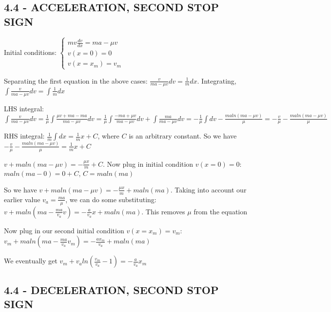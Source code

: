 \documentclass{article}
\begin{document}
\subsection{4.4 - ACCELERATION, SECOND STOP SIGN}
\noindent Initial conditions:
$\begin{cases}
    mv\frac{dv}{dx} = ma - \mu v \\
    v(x = 0) = 0 \\
    v(x = x_{m}) = v_{m}
    \end{cases}$ \par\vspace{0.25cm}

\noindent Separating the first equation in the above cases: $\frac{v}{ma - \mu v} dv = \frac{1}{m}dx$.  Integrating, $\int\frac{v}{ma - \mu v} dv = \int\frac{1}{m}dx$ \par
\noindent LHS integral: $\int\frac{v}{ma - \mu v} dv = \frac{1}{\mu}\int\frac{\mu v + ma - ma}{ma - \mu v}dv = \frac{1}{\mu}\int\frac{-ma + \mu v}{ma - \mu v}dv + \int\frac{ma}{ma - \mu v}dv = -\frac{1}{\mu}\int dv - \frac{maln(ma - \mu v)}{\mu} = -\frac{v}{\mu} - \frac{maln(ma - \mu v)}{\mu}$ \par
\noindent RHS integral: $\frac{1}{m}\int dx = \frac{1}{m}x + C$, where $C$ is an arbitrary constant.  So we have $ -\frac{v}{\mu} - \frac{ma ln(ma - \mu v)}{\mu} =  \frac{1}{m}x + C$ \par
\noindent $v + ma ln(ma - \mu v) = -\frac{\mu x}{m} + C$.  Now plug in initial condition $v(x = 0) = 0$: $ma ln(ma - 0) = 0 + C$, $C = maln(ma)$ \par
\noindent So we have $v + maln(ma - \mu v) = -\frac{\mu x}{m} + maln(ma)$.  Taking into account our earlier value $v_{a} = \frac{ma}{\mu}$, we can do some substituting: $v + ma ln(ma - \frac{ma}{v_{a}}v) = -\frac{a}{v_{a}}x + maln(ma)$.  This removes $\mu$ from the equation \par\vspace{0.25cm}

\noindent Now plug in our second initial condition $v(x = x_{m}) = v_{m}$: $v_{m} + ma ln(ma - \frac{ma}{v_{a}}v_{m}) = -\frac{ax_{m}}{v_{a}} + ma ln(ma)$ \par
\noindent We eventually get $v_{m} + v_{a}ln(\frac{v_{m}}{v_{a}} - 1) = -\frac{a}{v_{a}}x_{m}$

\subsection{4.4 - DECELERATION, SECOND STOP SIGN}
\end{document}

